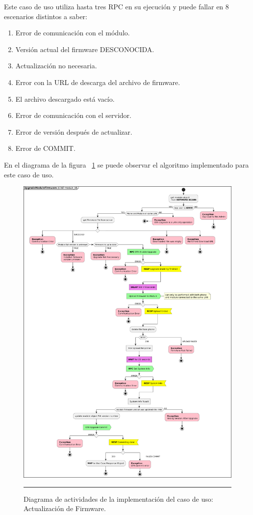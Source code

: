 Este caso de uso utiliza hasta tres RPC en su ejecución y puede fallar en 8 escenarios distintos a saber:

\begin{enumerate}
	\item Error de comunicación con el módulo.
	\item Versión actual del firmware DESCONOCIDA.
	\item Actualización no necesaria.
	\item Error con la URL de descarga del archivo de firmware.
	\item El archivo descargado está vacío.
	\item Error de comunicación con el servidor.
	\item Error de versión después de actualizar.
	\item Error de COMMIT.
\end{enumerate} 

En el diagrama de la figura ~\ref{fig:act_ota} se puede observar el algoritmo implementado para este caso de uso.

\begin{figure}[htbp]
	\centering
	\includegraphics[width=\textwidth]{Figures/iter3/ACT_ota_ink.png}
	\rule{35em}{1pt}
	\caption[Class Diagram]{Diagrama de actividades de la implementación del caso de uso: Actualización de Firmware.}
	\label{fig:act_ota}
\end{figure}

